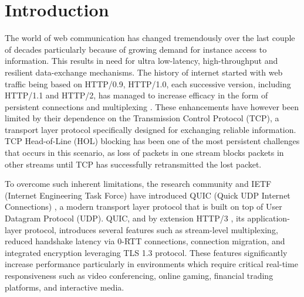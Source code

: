 




\chapter{Introduction}
\label{chap\:Introduction}

The world of web communication has changed tremendously over the last couple of decades particularly because of growing demand for instance access to information. This results in need for ultra low-latency, high-throughput and resilient data-exchange mechanisms. The history of internet started with web traffic being based on HTTP/0.9, HTTP/1.0, each successive version, including HTTP/1.1 and HTTP/2, has managed to increase efficacy in the form of persistent connections and multiplexing \cite{kurose2017}. These enhancements have however been limited by their dependence on the Transmission Control Protocol (TCP), a transport layer protocol specifically designed for exchanging reliable information. TCP Head-of-Line (HOL) blocking has been one of the most persistent challenges that occurs in this scenario, as loss of packets in one stream blocks packets in other streams until TCP has successfully retransmitted the lost packet.

To overcome such inherent limitations, the research community and IETF (Internet Engineering Task Force) have introduced QUIC (Quick UDP Internet Connections) \cite{rfc9000}, a modern transport layer protocol that is built on top of User Datagram Protocol (UDP). QUIC, and by extension HTTP/3 \cite{rfc9114}, its application-layer protocol, introduces several features such as stream-level multiplexing, reduced handshake latency via 0-RTT connections, connection migration, and integrated encryption leveraging TLS 1.3 protocol. These features significantly increase performance particularly in environments which require critical real-time responsiveness such as video conferencing, online gaming, financial trading platforms, and interactive media.

